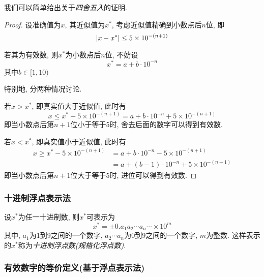 \begin{extend}
    我们可以简单给出关于\emph{四舍五入}的证明.

    \begin{proof}
        设准确值为$x$, 其近似值为$x^*$, 考虑近似值精确到小数点后$n$位, 即
        \begin{equation*}
            \abs{x-x^*}\le5\times10^{-(n+1)}
        \end{equation*}

        若其为有效数, 则$x^*$为小数点后$n$位, 不妨设
        \begin{equation*}
            x^*=a+b\cdot10^{-n}
        \end{equation*}
        其中$b\in[1,10)$

        特别地, 分两种情况讨论. 

        若$x>x^*$, 即真实值大于近似值, 此时有
        \begin{equation*}
            x\le x^*+5\times10^{-(n+1)}=a+b\cdot10^{-n}+5\times10^{-(n+1)}
        \end{equation*}
        即当小数点后第$n+1$位小于等于5时, 舍去后面的数字可以得到有效数.

        若$x<x^*$, 即真实值小于近似值, 此时有
        \begin{align*}
            x\ge x^*-5\times10^{-(n+1)}&=a+b\cdot10^{-n}-5\times10^{-(n+1)}\\
            &=a+(b-1)\cdot10^{-n}+5\times10^{-(n+1)}
        \end{align*}
        即当小数点后第$n+1$位大于等于5时, 进位可以得到有效数.
    \end{proof}
\end{extend}

\subsubsection{十进制浮点表示法}

\begin{definition}
    设$x^*$为任一十进制数, 则$x^*$可表示为
    \begin{equation*}
        x^*=\pm0.a_1a_2\cdots a_n\cdots\times10^m
    \end{equation*}
    其中, $a_1$为1到9之间的一个数字, $a_2\cdots a_n$为0到9之间的一个数字, $m$为整数. 这样表示的$x^*$称为\emph{十进制浮点数(规格化浮点数)}.
\end{definition}

\subsubsection{有效数字的等价定义(基于浮点表示法)}

